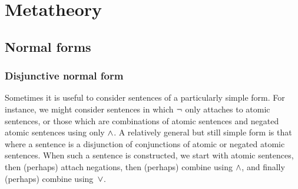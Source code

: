 \part{Metatheory}
\label{ch.normalform}

\chapter{Normal forms}\label{c:NormalForms}


\section{Disjunctive normal form}\label{s:DNFDefined}

Sometimes it is useful to consider sentences of a particularly simple form. For instance, we might consider sentences in which $\neg$ only attaches to atomic sentences, or those which are combinations of atomic sentences and negated atomic sentences using only $\wedge$.  A relatively general but still simple form is that where a sentence is a disjunction of conjunctions of atomic or negated atomic sentences.  When such a sentence is constructed, we start with atomic sentences, then (perhaps) attach negations, then (perhaps) combine using $\wedge$, and finally (perhaps) combine using~$\vee$.

